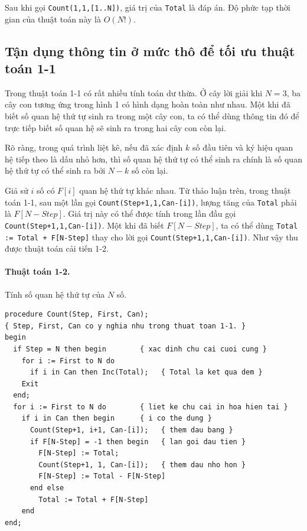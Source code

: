 \documentclass[11pt]{article}
\begin{document}
Sau khi gọi \verb|Count(1,1,[1..N])|, giá trị của \verb|Total| là đáp án. Độ
phức tạp thời gian của thuật toán này là \(O(N!)\).

\subsection{Tận dụng thông tin ở mức thô để tối ưu thuật toán 1-1}

Trong thuật toán 1-1 có rất nhiều tính toán dư thừa. Ở cây lời giải khi
\(N=3\), ba cây con tương ứng trong hình 1 có hình dạng hoàn toàn như nhau.
Một khi đã biết số quan hệ thứ tự sinh ra trong một cây con, ta có thể dùng
thông tin đó để trực tiếp biết số quan hệ sẽ sinh ra trong hai cây con còn
lại.

Rõ ràng, trong quá trình liệt kê, nếu đã xác định \(k\) số đầu tiên và ký hiệu
quan hệ tiếp theo là dấu nhỏ hơn, thì số quan hệ thứ tự có thể sinh ra chính
là số quan hệ thứ tự có thể sinh ra bởi \(N-k\) số còn lại.

Giả sử \(i\) số có \(F[i]\) quan hệ thứ tự khác nhau. Từ thảo luận trên, trong
thuật toán 1-1, sau một lần gọi \verb|Count(Step+1,1,Can-[i])|, lượng tăng
của \verb|Total| phải là \(F[N-\textit{Step}]\). Giá trị này có thể được tính
trong lần đầu gọi \verb|Count(Step+1,1,Can-[i])|. Một khi đã biết
\(F[N-\textit{Step}]\), ta có thể dùng
\verb|Total := Total + F[N-Step]| thay cho lời gọi
\verb|Count(Step+1,1,Can-[i])|. Như vậy thu được thuật toán cải tiến 1-2.

\paragraph{Thuật toán 1-2.} Tính số quan hệ thứ tự của \(N\) số.

\begin{verbatim}
procedure Count(Step, First, Can);
{ Step, First, Can co y nghia nhu trong thuat toan 1-1. }
begin
  if Step = N then begin        { xac dinh chu cai cuoi cung }
    for i := First to N do
      if i in Can then Inc(Total);   { Total la ket qua dem }
    Exit
  end;
  for i := First to N do        { liet ke chu cai in hoa hien tai }
    if i in Can then begin      { i co the dung }
      Count(Step+1, i+1, Can-[i]);   { them dau bang }
      if F[N-Step] = -1 then begin   { lan goi dau tien }
        F[N-Step] := Total;
        Count(Step+1, 1, Can-[i]);   { them dau nho hon }
        F[N-Step] := Total - F[N-Step]
      end else
        Total := Total + F[N-Step]
    end
end;
\end{verbatim}
\end{document}
